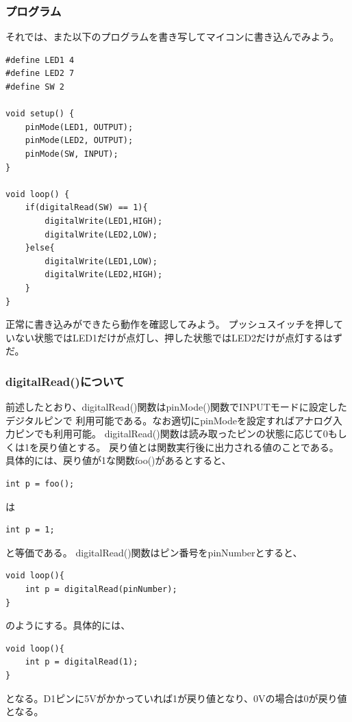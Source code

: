 \documentclass[uplatex]{jsarticle}
\begin{document}
\subsubsection{プログラム}
それでは、また以下のプログラムを書き写してマイコンに書き込んでみよう。
\begin{lstlisting}[basicstyle=\ttfamily\footnotesize, frame=single]
#define LED1 4
#define LED2 7
#define SW 2
    
void setup() {
    pinMode(LED1, OUTPUT);
    pinMode(LED2, OUTPUT);
    pinMode(SW, INPUT);
}
    
void loop() {
    if(digitalRead(SW) == 1){
        digitalWrite(LED1,HIGH);
        digitalWrite(LED2,LOW);
    }else{
        digitalWrite(LED1,LOW);
        digitalWrite(LED2,HIGH);
    }
}
\end{lstlisting}
正常に書き込みができたら動作を確認してみよう。
プッシュスイッチを押していない状態ではLED1だけが点灯し、押した状態ではLED2だけが点灯するはずだ。
\subsubsection{digitalRead()について}
前述したとおり、digitalRead()関数はpinMode()関数でINPUTモードに設定したデジタルピンで
利用可能である。なお適切にpinModeを設定すればアナログ入力ピンでも利用可能。
digitalRead()関数は読み取ったピンの状態に応じて0もしくは1を戻り値とする。
戻り値とは関数実行後に出力される値のことである。
具体的には、戻り値が1な関数foo()があるとすると、
\begin{lstlisting}[basicstyle=\ttfamily\footnotesize, frame=single]
int p = foo();
\end{lstlisting}
は
\begin{lstlisting}[basicstyle=\ttfamily\footnotesize, frame=single]
int p = 1;
\end{lstlisting}
と等価である。
digitalRead()関数はピン番号をpinNumberとすると、
\begin{lstlisting}[basicstyle=\ttfamily\footnotesize, frame=single]
void loop(){
    int p = digitalRead(pinNumber);
}
\end{lstlisting}
のようにする。具体的には、
\begin{lstlisting}[basicstyle=\ttfamily\footnotesize, frame=single]
void loop(){
    int p = digitalRead(1);
}
\end{lstlisting}
となる。D1ピンに5Vがかかっていれば1が戻り値となり、0Vの場合は0が戻り値となる。
\end{document}
